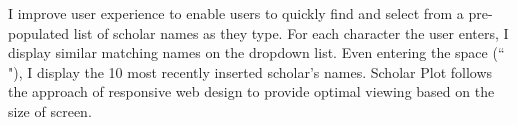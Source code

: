 
I improve user experience to enable users to quickly find and select from a pre-populated list of scholar names as they type. For each character the user enters, I display similar matching names on the dropdown list. Even entering the space (`` "), I display the 10 most recently inserted scholar's names. Scholar Plot follows the approach of responsive web design to provide optimal viewing based on the size of screen.



